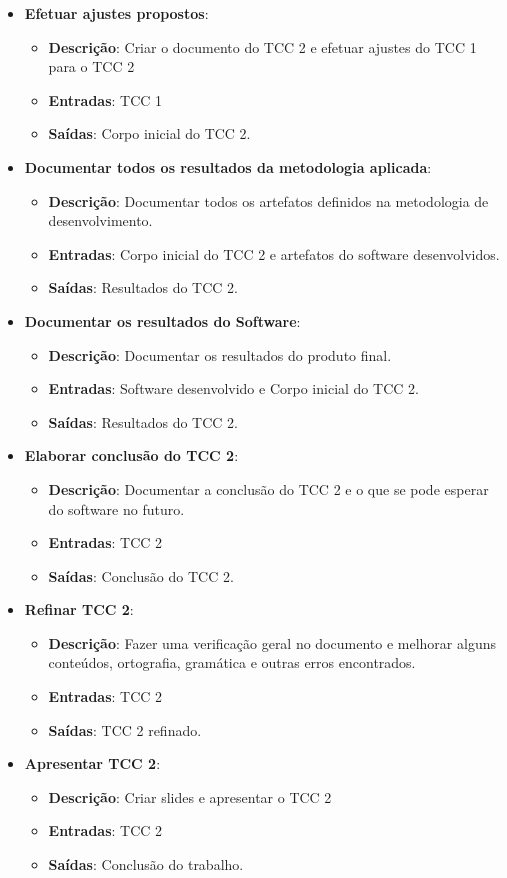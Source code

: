 \begin{itemize}
  \item \textbf{Efetuar ajustes propostos}:
  \begin{itemize}
    \item \textbf{Descrição}: Criar o documento do TCC 2 e efetuar ajustes do TCC 1 para o TCC 2
    \item \textbf{Entradas}: TCC 1
    \item \textbf{Saídas}: Corpo inicial do TCC 2.
  \end{itemize}
  \item \textbf{Documentar todos os resultados da metodologia aplicada}:
  \begin{itemize}
    \item \textbf{Descrição}: Documentar todos os artefatos definidos na metodologia de desenvolvimento.
    \item \textbf{Entradas}: Corpo inicial do TCC 2 e artefatos do software desenvolvidos.
    \item \textbf{Saídas}: Resultados do TCC 2.
  \end{itemize}
  \item \textbf{Documentar os resultados do Software}:
  \begin{itemize}
    \item \textbf{Descrição}: Documentar os resultados do produto final.
    \item \textbf{Entradas}: Software desenvolvido e Corpo inicial do TCC 2.
    \item \textbf{Saídas}: Resultados do TCC 2.
  \end{itemize}
  \item \textbf{Elaborar conclusão do TCC 2}:
  \begin{itemize}
    \item \textbf{Descrição}: Documentar a conclusão do TCC 2 e o que se pode esperar do software no futuro.
    \item \textbf{Entradas}: TCC 2
    \item \textbf{Saídas}: Conclusão do TCC 2.
  \end{itemize}
  \item \textbf{Refinar TCC 2}:
  \begin{itemize}
    \item \textbf{Descrição}: Fazer uma verificação geral no documento e melhorar alguns conteúdos, ortografia,
      gramática e outras erros encontrados.
    \item \textbf{Entradas}: TCC 2
    \item \textbf{Saídas}: TCC 2 refinado.
  \end{itemize}
  \item \textbf{Apresentar TCC 2}:
  \begin{itemize}
    \item \textbf{Descrição}: Criar slides e apresentar o TCC 2
    \item \textbf{Entradas}: TCC 2
    \item \textbf{Saídas}: Conclusão do trabalho.
  \end{itemize}
\end{itemize}

